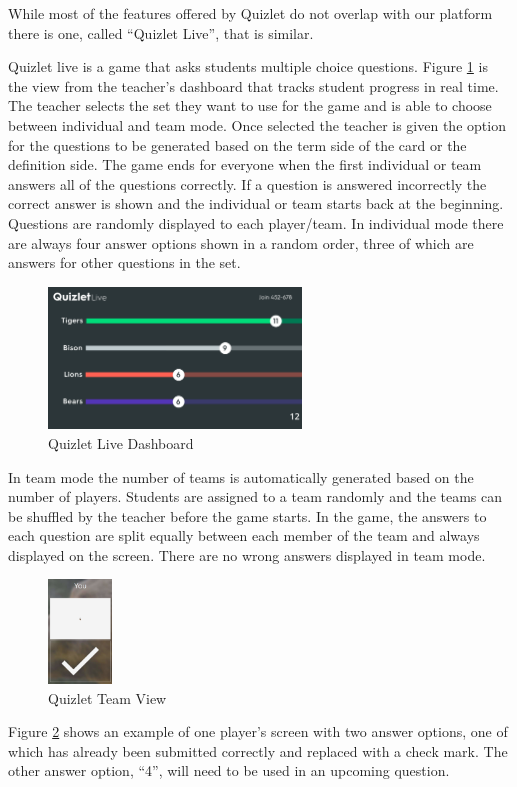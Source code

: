 \documentclass{article}
\begin{document}
        While most of the features offered by Quizlet do not overlap with our platform there is one, called ``Quizlet Live'', that is similar.
        \smallskip
        
        Quizlet live is a game that asks students multiple choice questions. Figure \ref{fig:quizlet-live} is the view from the teacher's dashboard that tracks student progress in real time. The teacher selects the set they want to use for the game and is able to choose between individual and team mode. Once selected the teacher is given the option for the questions to be generated based on the term side of the card or the definition side. The game ends for everyone when the first individual or team answers all of the questions correctly. If a question is answered incorrectly the correct answer is shown and the individual or team starts back at the beginning. Questions are randomly displayed to each player/team. In individual mode there are always four answer options shown in a random order, three of which are answers for other questions in the set.
        
        \begin{figure}[ht]
            \centering
            \includegraphics[width=0.6\textwidth]{images/quizlet-live.png}
            \caption{Quizlet Live Dashboard \cite{quizlet}}
            \label{fig:quizlet-live}
        \end{figure}
        
        In team mode the number of teams is automatically generated based on the number of players. Students are assigned to a team randomly and the teams can be shuffled by the teacher before the game starts. In the game, the answers to each question are split equally between each member of the team and always displayed on the screen. There are no wrong answers displayed in team mode.
        \begin{figure}
            \centering
            \includegraphics[width=0.15\textwidth]{images/quizlet-team.png}
            \caption{Quizlet Team View \cite{quizlet}}
            \label{fig:quizlet-team}
        \end{figure}
        Figure \ref{fig:quizlet-team} shows an example of one player's screen with two answer options, one of which has already been submitted correctly and replaced with a check mark. The other answer option, ``4'', will need to be used in an upcoming question.
        \smallskip
        
\end{document}
